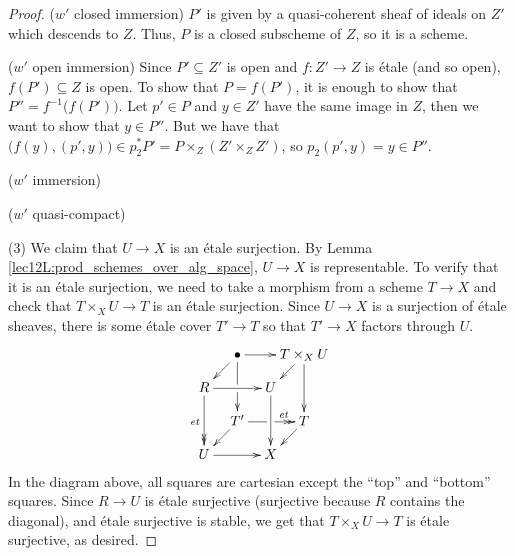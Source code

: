 \begin{proof}
   ($w'$ closed immersion) $P'$ is given by a
   quasi-coherent sheaf of ideals on $Z'$ which descends to $Z$. Thus, $P$ is a closed
   subscheme of $Z$, so it is a scheme.

   ($w'$ open immersion) Since $P'\subseteq Z'$ is open and $f:Z'\to Z$ is \'etale (and
   so open), $f(P')\subseteq Z$ is open. To show that $P=f(P')$, it is enough to show
   that $P'' = f^{-1}\bigl(f(P')\bigr)$. Let $p'\in P$ and $y\in Z'$ have the same image
   in $Z$, then we want to show that $y\in P''$. But we have that
   $\bigl(f(y),(p',y)\bigr)\in p_2^*P'=P\times_Z (Z'\times_Z Z')$, so $p_2(p',y)=y\in
   P''$. 

   ($w'$ immersion) 

   ($w'$ quasi-compact) 

   (3) We claim that $U\to X$ is an \'etale surjection. By Lemma
   \ref{lec12L:prod_schemes_over_alg_space}, $U\to X$ is representable. To verify that it
   is an \'etale surjection, we need to take a morphism from a scheme $T\to X$ and check
   that $T\times_X U\to T$ is an \'etale surjection. Since $U\to X$ is a surjection of
   \'etale sheaves, there is some \'etale cover $T'\to T$ so that $T'\to X$ factors
   through $U$.
   \[\xymatrix@!0{
    & \bullet \ar[dl] \ar[dd]|\hole \ar[rr] & & T\times_X U \ar[dd] \ar[dl]\\
    R\ar[rr] \ar@{->>}[dd]_{et} & & U\ar[dd]\\
    & T'\ar[dl]\ar@{->>}[rr]^(.7){et}|\hole & & T\ar[dl]\\
    U\ar[rr] & & X
   }\]
    In the diagram above, all squares are cartesian except the ``top'' and ``bottom''
   squares. Since $R\to U$ is \'etale surjective (surjective because $R$ contains the
   diagonal), and \'etale surjective is stable, we get that $T\times_X U\to T$ is \'etale
   surjective, as desired.
%
%
 \end{proof}
